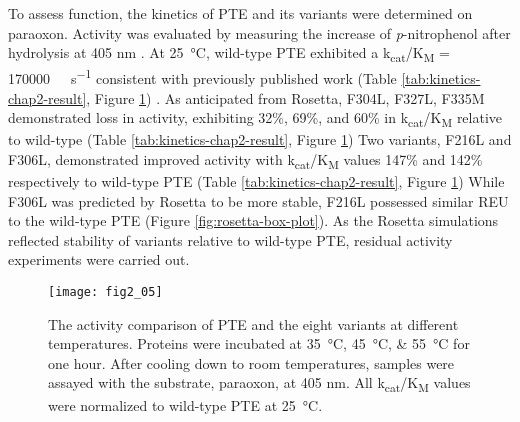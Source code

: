 \begin{refsection}
To assess function, the kinetics of PTE and its variants were determined on
paraoxon. Activity was evaluated by measuring the increase of
\emph{p}-nitrophenol after hydrolysis at 405
nm \cite{Baker2011b,Yang2014a,Carr1996b,Cho2004b}. At \SI{25}{\celsius},
wild-type PTE exhibited a k\textsubscript{cat}/K\textsubscript{M} =
\SI{170000}{\per\Molar\per\second} consistent with previously published work
(Table \ref{tab:kinetics-chap2-result}, Figure \ref{fig:activity-chart}) 
\cite{Yang2014a,Baker2011b}. As anticipated from Rosetta, F304L, F327L, F335M
demonstrated loss in activity, exhibiting 32\%, 69\%, and 60\% in
k\textsubscript{cat}/K\textsubscript{M} relative to wild-type (Table
\ref{tab:kinetics-chap2-result}, Figure \ref{fig:activity-chart}) Two variants, F216L
and F306L, demonstrated improved activity with
k\textsubscript{cat}/K\textsubscript{M} values 147\% and 142\% respectively to
wild-type PTE (Table \ref{tab:kinetics-chap2-result}, Figure
\ref{fig:activity-chart}) While F306L was predicted by Rosetta to be more
stable, F216L possessed similar REU to the wild-type PTE (Figure
\ref{fig:rosetta-box-plot}). As the Rosetta simulations reflected stability of
variants relative to wild-type PTE, residual activity experiments were carried
out.
\begin{figure}[htbp] \centering \texttt{[image: fig2\_05]}
    \caption[The activity comparison of PTE and the eight variants at different
        temperatures. Proteins were incubated at \SIlist{35;45;55}{\celsius}
        for one hour. After cooling down to room temperatures, samples were
        assayed with the substrate, paraoxon, at 405 nm. All
        k\textsubscript{cat}/K\textsubscript{M} values were normalized to
        wild-type PTE at \SI{25}{\celsius}.]{The activity comparison of PTE and
            the eight variants at different temperatures. Proteins were
            incubated at \SIlist{35;45;55}{\celsius} for one hour. After
            cooling down to room temperatures, samples were assayed with the
            substrate, paraoxon, at 405 nm. All
            k\textsubscript{cat}/K\textsubscript{M} values were normalized to
            wild-type PTE at \SI{25}{\celsius}.}
    \label{fig:activity-chart}
\end{figure}


\end{refsection}
